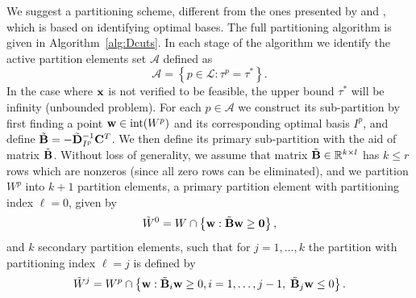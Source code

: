 \documentclass[12pt,x11names]{article}
\theoremstyle{definition}
\newcommand{\paren}[1]{\left\{ {#1} \right\}} %
\newcommand{\real}{\mathbb{R}} %
\newcommand{\inter}{\mathrm{int}} %
\newcommand{\bzero}{{\bf 0}}
\newcommand{\bw}{{\bf w}}
\newcommand{\bx}{{\bf x}}
\newcommand{\bbb}{{\bf B}}
\newcommand{\bbc}{{\bf C}}
\newcommand{\bbd}{{\bf D}}
\begin{document}
We suggest a partitioning scheme, different from the ones presented by \citet{BertsimasDunning2014} and \citet{PostekDenHertog2014}, which is based on identifying optimal bases. The full partitioning algorithm is given in Algorithm~\ref{alg:Dcuts}. In each stage of the algorithm we identify the active partition elements set $\mathcal{A}$ defined as
$$\mathcal{A}=\paren{p\in \mathcal{L}: \tau^p=\tau^*}.$$ In the case where $\bx$ is not verified to be feasible, the upper bound  $\tau^*$ will be infinity (unbounded problem). For each $p\in \mathcal{A}$ we construct its sub-partition by first finding a point $\bw\in\inter{(W^p)}$ and its corresponding optimal basis $I^p$, and define $\tilde{\bbb}=-\tilde{\bbd}_{I^p}^{-1}\bbc^T$. We then define its primary sub-partition with the aid of matrix $\tilde{\bbb}$. Without loss of generality, we assume that matrix $\tilde{\bbb}\in\real^{k\times l}$ has $k\leq r$ rows which are nonzeros (since all zero rows can be eliminated), and we partition $W^p$ into $k+1$ partition elements, a primary partition element with partitioning index $\ell=0$, given by
\begin{equation}\label{eq:primary_part} \tilde{W}^{0}=W\cap \paren{\bw: \tilde{\bbb}\bw\geq \bzero},\end{equation}
and $k$ secondary partition elements, such that for $j=1,\ldots, k$ the partition with partitioning index $\ell=j$ is defined by 
\begin{equation}\label{eq:secondary_part} \tilde{W}^j=W^p \cap \paren{\bw: \tilde{\bbb}_i\bw\geq 0, i=1,\ldots,j-1,\;  \tilde{\bbb}_j\bw\leq 0 }.\end{equation}
\end{document}
